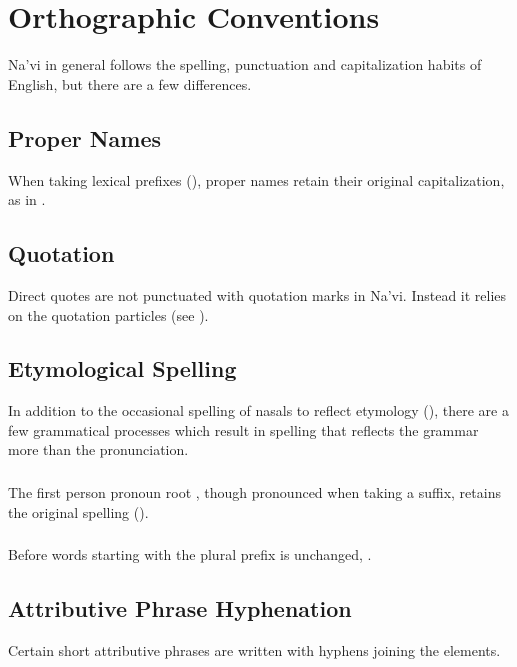 \section{Orthographic Conventions}
\noindent Na'vi in general follows the spelling, punctuation and
capitalization habits of English, but there are a few differences.

\subsection{Proper Names} When taking lexical prefixes
(), proper names retain their original
capitalization, as in .

\subsection{Quotation} Direct quotes are not punctuated with quotation
marks in Na'vi.  Instead it relies on the quotation particles
 (see ).

\subsection{Etymological Spelling} In addition to the occasional
spelling of nasals to reflect etymo\-logy (),
there are a few grammatical processes which result in spelling that
reflects the grammar more than the pronunciation.

\subsubsection{} The first person pronoun root , though
pronounced  when taking a suffix, retains the original spelling
().

\subsubsection{} Before words starting with  the plural prefix
 is unchanged, .

\subsection{Attributive Phrase Hyphenation} Certain short attributive
phrases are written with hy\-phens joining the elements.

